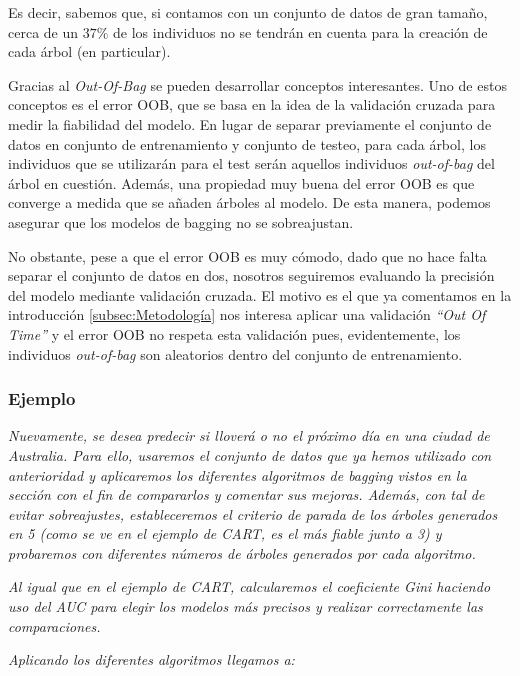 \documentclass[12pt,twoside]{article}
\begin{document}
Es decir, sabemos que, si contamos con un conjunto de datos de gran tamaño, cerca de un $37 \%$ de los individuos no se tendrán en cuenta para la creación de cada árbol (en particular).

Gracias al \textit{Out-Of-Bag} se pueden desarrollar conceptos interesantes. Uno de estos conceptos es el error OOB, que se basa en la idea de la validación cruzada para medir la fiabilidad del modelo. En lugar de separar previamente el conjunto de datos en conjunto de entrenamiento y conjunto de testeo, para cada árbol, los individuos que se utilizarán para el test serán aquellos individuos \textit{out-of-bag} del árbol en cuestión. Además, una propiedad muy buena del error OOB es que converge a medida que se añaden árboles al modelo. De esta manera, podemos asegurar que los modelos de bagging no se sobreajustan.

No obstante, pese a que el error OOB es muy cómodo, dado que no hace falta separar el conjunto de datos en dos, nosotros seguiremos evaluando la precisión del modelo mediante validación cruzada. El motivo es el que ya comentamos en la introducción \ref{subsec:Metodología} nos interesa aplicar una validación \textit{``Out Of Time''} y el error OOB no respeta esta validación pues, evidentemente, los individuos \textit{out-of-bag} son aleatorios dentro del conjunto de entrenamiento.




\subsubsection{Ejemplo} \label{ex:Bag}
\emph{Nuevamente, se desea predecir si lloverá o no el próximo día en una ciudad de Australia. Para ello, usaremos el conjunto de datos que ya hemos utilizado con anterioridad y aplicaremos los diferentes algoritmos de bagging vistos en la sección con el fin de compararlos y comentar sus mejoras. Además, con tal de evitar sobreajustes, estableceremos el criterio de parada de los árboles generados en 5 (como se ve en el ejemplo de CART, es el más fiable junto a 3) y probaremos con diferentes números de árboles generados por cada algoritmo.}

\emph{Al igual que en el ejemplo de CART, calcularemos el coeficiente Gini haciendo uso del AUC para elegir los modelos más precisos y realizar correctamente las comparaciones.}

\emph{Aplicando los diferentes algoritmos llegamos a: }
\end{document}
